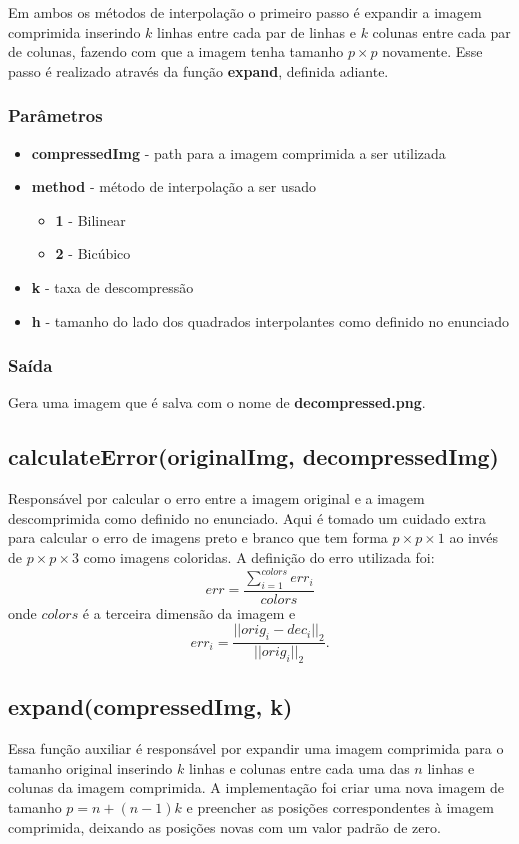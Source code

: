 \documentclass[leqno]{article}
\begin{document}
Em ambos os métodos de interpolação o primeiro passo é expandir a
imagem comprimida inserindo $k$ linhas entre cada par de linhas e $k$ colunas
entre cada par de colunas, fazendo com que a imagem tenha tamanho $p \times p$
novamente. Esse passo é realizado através da função \textbf{expand}, definida
adiante.


\subsubsection{Parâmetros}
\begin{itemize}
    \item \textbf{compressedImg} - path para a imagem comprimida a ser utilizada
    \item \textbf{method} - método de interpolação a ser usado
    \begin{itemize}
        \item \textbf{1} - Bilinear
        \item \textbf{2} - Bicúbico
    \end{itemize}
    \item \textbf{k} - taxa de descompressão
    \item \textbf{h} - tamanho do lado dos quadrados interpolantes como definido
                        no enunciado
\end{itemize}

\subsubsection{Saída}
Gera uma imagem que é salva com o nome de \textbf{decompressed.png}.


\subsection{calculateError(originalImg, decompressedImg)}
Responsável por calcular o erro entre a imagem original e a imagem descomprimida
como definido no enunciado. Aqui é tomado um cuidado extra para calcular o erro
de imagens preto e branco que tem forma $p \times p \times 1$ ao invés de 
$p \times p \times 3$ como imagens coloridas.
A definição do erro utilizada foi:
$$ err = \frac{\displaystyle\sum_{i=1}^{colors} err_i}{colors}$$
onde $colors$ é a terceira dimensão da imagem e
$$ err_i = \frac{||orig_i - dec_i||_2}{||orig_i||_2}. $$

\subsection{expand(compressedImg, k)}
Essa função auxiliar é responsável por expandir uma imagem comprimida para o
tamanho original inserindo $k$ linhas e colunas entre cada uma das $n$ linhas
e colunas da imagem comprimida.
A implementação foi criar uma nova imagem de tamanho $p = n + (n-1)k$ e preencher
as posições correspondentes à imagem comprimida, deixando as posições novas com
um valor padrão de zero.
\end{document}
